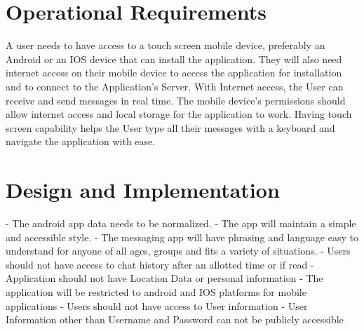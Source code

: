 \documentclass[11pt]{article}
\theoremstyle{plain}
\theoremstyle{definition}
\begin{document}
\section{Operational Requirements}\label{sec:operationalrequirements}
A user needs to have access to a touch screen mobile device, preferably an Android or an IOS device that can install the application. They will also need  internet access on their mobile device to access the application for installation and to connect to the Application's Server. With Internet access, the User can receive and send messages in real time. The mobile device’s permissions should allow internet access and local storage for the application to work. Having touch screen capability helps the User type all their messages with a keyboard and navigate the application with ease.

\section{Design and Implementation}\label{sec:designandimplementationrequirements}
- The android app data needs to be normalized. \newline
- The app will maintain a simple and accessible style. \newline
- The messaging app will have phrasing and language easy to understand for anyone of all 
  ages, groups and fits a variety of situations. \newline
- Users should not have access to chat history after an allotted time or if read \newline
- Application should not have Location Data or personal information \newline
- The application will be restricted to android and IOS platforms for mobile applications \newline
- Users should not have access to User information \newline
- User Information other than Username and Password can not be publicly accessible \newline

\newpage
\end{document}
